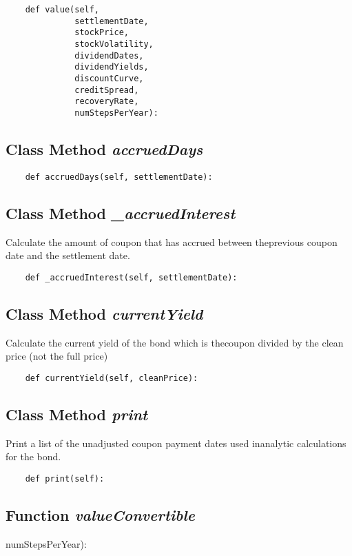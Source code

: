 \documentclass[twoside,11pt]{book}
\begin{document}
\begin{lstlisting}
    def value(self,
              settlementDate,
              stockPrice,
              stockVolatility,
              dividendDates,
              dividendYields,
              discountCurve,
              creditSpread,
              recoveryRate,
              numStepsPerYear):
\end{lstlisting}

\subsection{Class Method {\it accruedDays}}


\begin{lstlisting}
    def accruedDays(self, settlementDate):
\end{lstlisting}

\subsection{Class Method {\it \_accruedInterest}}
Calculate the amount of coupon that has accrued between theprevious coupon date and the settlement date. 

\begin{lstlisting}
    def _accruedInterest(self, settlementDate):
\end{lstlisting}

\subsection{Class Method {\it currentYield}}
Calculate the current yield of the bond which is thecoupon divided by the clean price (not the full price)

\begin{lstlisting}
    def currentYield(self, cleanPrice):
\end{lstlisting}

\subsection{Class Method {\it print}}
Print a list of the unadjusted coupon payment dates used inanalytic calculations for the bond. 

\begin{lstlisting}
    def print(self):
\end{lstlisting}

\subsection{Function {\it valueConvertible}}
numStepsPerYear):
\end{document}
